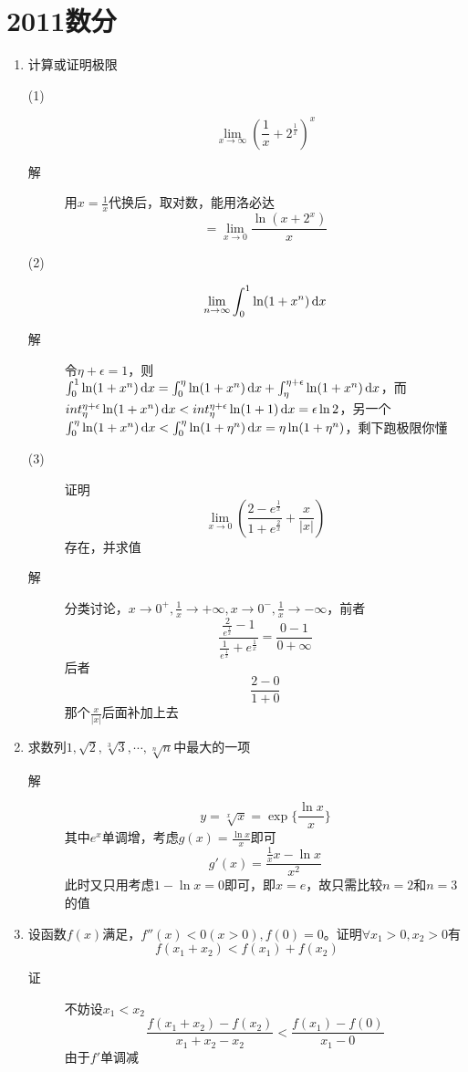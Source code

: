 \section{2011数分}
\begin{enumerate}
\item 计算或证明极限
\begin{description}
\item[(1)]
\[
\lim_{x \to \infty}(\frac{1}{x}+2^\frac{1}{x})^x
\]
\item[解] 用$x=\frac{1}{x}$代换后，取对数，能用洛必达
\[
= \lim_{x \to 0}\frac{\ln(x+2^x)}{x}
\]
\item[(2)]
\[
\lim_{n \to \infty}\int_0^1 \ln(1+x^n)\,\mathrm{d} x
\]
\item[解] 令$\eta + \epsilon=1$，则$\int_0^1 \ln(1+x^n)\,\mathrm{d} x = \int_0^\eta \ln(1+x^n)\,\mathrm{d} x+\int_\eta^{\eta+\epsilon} \ln(1+x^n)\,\mathrm{d} x$，而$int_\eta^{\eta+\epsilon} \ln(1+x^n)\,\mathrm{d} x<int_\eta^{\eta+\epsilon} \ln(1+1)\,\mathrm{d} x=\epsilon \ln 2$，另一个$\int_0^\eta \ln(1+x^n)\,\mathrm{d} x<\int_0^\eta \ln(1+\eta^n)\,\mathrm{d} x=\eta\ln(1+\eta^n)$，剩下跑极限你懂

\item[(3)] 证明
\[
\lim_{x \to 0}\left(\frac{2-e^{\frac{1}{x}}}{1+e^{\frac{2}{x}}}+\frac{x}{|x|}\right)
\]
存在，并求值
\item[解] 分类讨论，$x\to 0^+,\frac{1}{x} \to +\infty,x\to 0^-,\frac{1}{x} \to -\infty$，前者
\[
\frac{\frac{2}{e^{\frac{1}{x}}}-1}{\frac{1}{e^{\frac{1}{x}}}+e^{\frac{1}{x}}}=\frac{0-1}{0+\infty}
\]
后者
\[
\frac{2-0}{1+0}
\]
那个$\frac{x}{|x|}$后面补加上去
\end{description}

\item 求数列$1,\sqrt{2},\sqrt[3]{3},\cdots,\sqrt[n]{n}$中最大的一项
\begin{description}
\item[解]
\[
y=\sqrt[x]{x} = \exp\{\frac{\ln x}{x}\}
\]
其中$e^x$单调增，考虑$g(x)=\frac{\ln x}{x}$即可
\[
g'(x) = \frac{\frac{1}{x}x-\ln x}{x^2}
\]
此时又只用考虑$1-\ln x=0$即可，即$x=e$，故只需比较$n=2$和$n=3$的值
\end{description}

\item 设函数$f(x)$满足，$f''(x)<0(x>0),f(0)=0$。证明$\forall x_1 >0,x_2>0$有
\[
f(x_1+x_2)<f(x_1)+f(x_2)
\]
\begin{description}
\item[证] 不妨设$x_1<x_2$
\[
\frac{f(x_1+x_2)-f(x_2)}{x_1+x_2-x_2} < \frac{f(x_1)-f(0)}{x_1-0}
\]
由于$f'$单调减
\end{description}


\end{enumerate}
